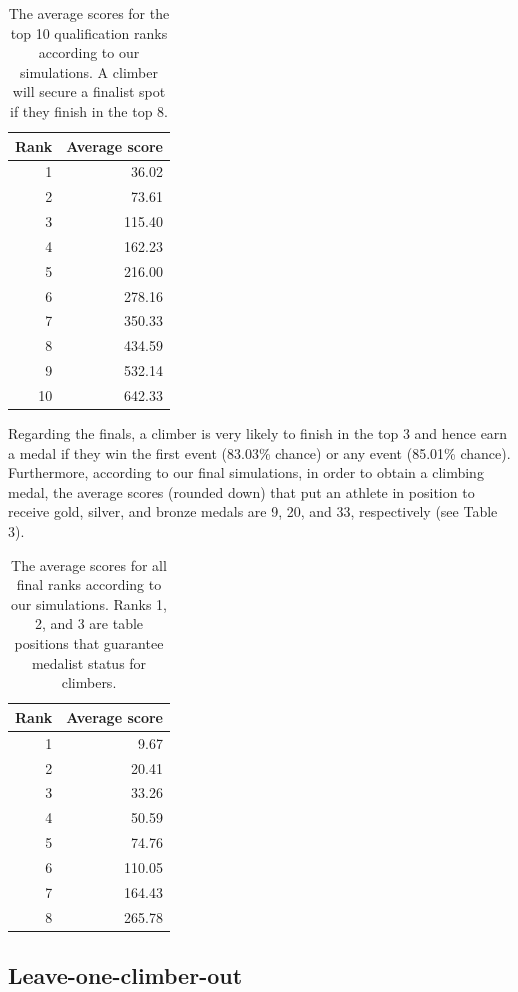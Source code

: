 \documentclass[12pt]{article}
\begin{document}
\begin{table}[ht]
\centering
\caption{The average scores for the top 10 qualification ranks according to our simulations. A climber will secure a finalist spot if they finish in the top 8.} 
\begin{tabular}{rr}
  \hline
Rank & Average score \\ 
  \hline
  1 & 36.02 \\ 
    2 & 73.61 \\ 
    3 & 115.40 \\ 
    4 & 162.23 \\ 
    5 & 216.00 \\ 
    6 & 278.16 \\ 
    7 & 350.33 \\ 
    8 & 434.59 \\ 
    9 & 532.14 \\ 
   10 & 642.33 \\ 
   \hline
\end{tabular}
\end{table}

Regarding the finals, a climber is very likely to finish in the top 3
and hence earn a medal if they win the first event (83.03\% chance) or
any event (85.01\% chance). Furthermore, according to our final
simulations, in order to obtain a climbing medal, the average scores
(rounded down) that put an athlete in position to receive gold, silver,
and bronze medals are 9, 20, and 33, respectively (see Table 3).

\begin{table}[ht]
\centering
\caption{The average scores for all final ranks according to our simulations. Ranks 1, 2, and 3 are table positions that guarantee medalist status for climbers.} 
\begin{tabular}{rr}
  \hline
Rank & Average score \\ 
  \hline
  1 & 9.67 \\ 
    2 & 20.41 \\ 
    3 & 33.26 \\ 
    4 & 50.59 \\ 
    5 & 74.76 \\ 
    6 & 110.05 \\ 
    7 & 164.43 \\ 
    8 & 265.78 \\ 
   \hline
\end{tabular}
\end{table}

\hypertarget{leave-one-climber-out}{%
\subsection{Leave-one-climber-out}\label{leave-one-climber-out}}
\end{document}
